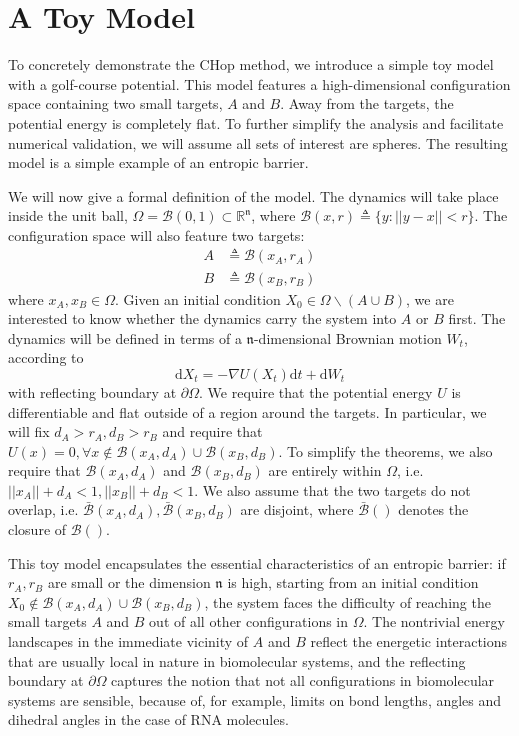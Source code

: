 \documentclass[english, aip, jcp, priprint, graphicx,floatfix]{revtex4-1}
\theoremstyle{plain}
\theoremstyle{definition}
\theoremstyle{plain}
\newcommand{\dimension}{{\mathfrak{n}}}
\newcommand{\bb}[1]{\mathcal{B}\left(#1\right)}
\newcommand{\BB}[1]{\mathcal{\bar B}\left(#1\right)}
\begin{document}
\section{A Toy Model}\label{sec:toy_model}

To concretely demonstrate the CHop method, we introduce a simple toy model with a golf-course potential.  This model features a high-dimensional configuration space containing two small targets, $A$ and $B$.  Away from the targets, the potential energy is completely flat.  To further simplify the analysis and facilitate numerical validation, we will assume all sets of interest are spheres. The resulting model is a simple example of an entropic barrier.  

We will now give a formal definition of the model.  The dynamics will take place inside the unit ball, $\Omega = \bb{0,1}\subset \mathbb{R}^\dimension$, where $\bb{x, r} \triangleq \{ y : || y - x || < r \}$.  The configuration space will also feature two targets:
\begin{align*}
A &\triangleq \bb {x_A, r_A}\\
B &\triangleq \bb {x_B, r_B}
\end{align*}
where $x_A,x_B \in \Omega$.  Given an initial condition $X_0\in \Omega \backslash (A\cup B)$, we are interested to know whether the dynamics carry the system into $A$ or $B$ first.  The dynamics will be defined in terms of a $\dimension$-dimensional Brownian motion $W_t$, according to 
\begin{equation} \label{equ:toy_sde}
\mathrm{d} X_t = - \nabla U (X_t) \mathrm{d} t + \mathrm{d} W_t 
\end{equation}
with reflecting boundary at $\partial\Omega$.  We require that the potential energy $U$ is differentiable and flat outside of a region around the targets.  In particular, we will fix $d_A>r_A, d_B>r_B$ and require that $U (x) = 0, \forall x \not\in \bb{x_A,d_A} \cup \bb{x_B,d_B}$.  To simplify the theorems, we also require that $\bb{x_A, d_A}$ and $\bb{x_B, d_B}$ are entirely within $\Omega$, i.e. $||x_A||+d_A<1,||x_B||+d_B<1$.  We also assume that the two targets do not overlap, i.e. $\BB{x_A,d_A},\BB{x_B,d_B}$ are disjoint, where $\BB{}$ denotes the closure of $\bb{}$.  

This toy model encapsulates the essential characteristics of an entropic barrier: if $r_A, r_B$ are small or the dimension $\dimension$ is high, starting from an initial condition $X_0 \not\in \bb{x_A,d_A} \cup \bb{x_B,d_B}$, the system faces the difficulty of reaching the small targets $A$ and $B$ out of all other configurations in $\Omega$. The nontrivial energy landscapes in the immediate vicinity of $A$ and $B$ reflect the energetic interactions that are usually local in nature in biomolecular systems, and the reflecting boundary at $\partial\Omega$ captures the notion that not all configurations in biomolecular systems are sensible, because of, for example, limits on bond lengths, angles and dihedral angles in the case of RNA molecules.
\end{document}
